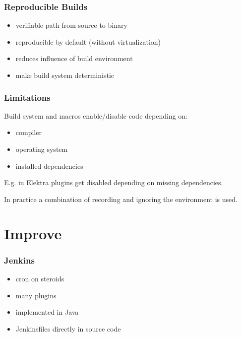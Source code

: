 \begin{frame}
	\frametitle{Reproducible Builds}

	\begin{itemize}[<+-| alert@+>]

	\item verifiable path from source to binary
	\item reproducible by default (without virtualization)
	\item reduces influence of build environment
	\item make build system deterministic
	\end{itemize}
\end{frame}

\begin{frame}
	\frametitle{Limitations}

	Build system and macros enable/disable code depending on:

	\begin{itemize}
	\item compiler
	\item operating system
	\item installed dependencies
	\end{itemize}

	E.g. in Elektra plugins get disabled depending on missing dependencies.

	\pause
	\vspace{1cm}

	\begin{solution}
	In practice a combination of recording and ignoring the environment is used.
	\end{solution}
\end{frame}

\section{Improve}

\begin{frame}
	\frametitle{Jenkins}

	\begin{itemize}[<+-| alert@+>]

	\item cron on steroids
	\item many plugins
	\item implemented in Java
	\item Jenkinsfiles directly in source code
	\end{itemize}
\end{frame}

